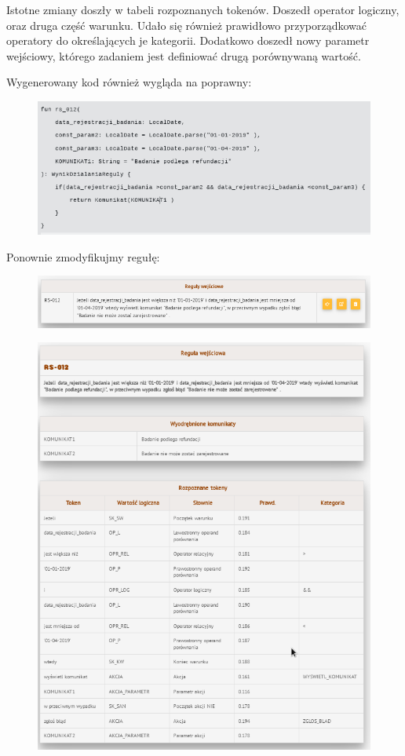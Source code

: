 Istotne zmiany doszły w tabeli rozpoznanych tokenów. Doszedł operator logiczny, oraz druga część warunku. Udało się również prawidłowo przyporządkować operatory do określających je kategorii. Dodatkowo doszedł nowy parametr wejściowy, którego zadaniem jest definiować drugą porównywaną wartość. 

Wygenerowany kod również wygląda na poprawny:
\begin{figure}[H]
	\centering
	\includegraphics[scale=0.8]{img/app-eksperymenty/p2-3.png}
\end{figure}

Ponownie zmodyfikujmy regułę:
\begin{figure}[H]
	\centering
	\includegraphics[scale=0.8]{img/app-eksperymenty/p3-1.png}
\end{figure}

\begin{figure}[H]
	\centering
	\includegraphics[scale=0.8]{img/app-eksperymenty/p3-2.png}
\end{figure}

